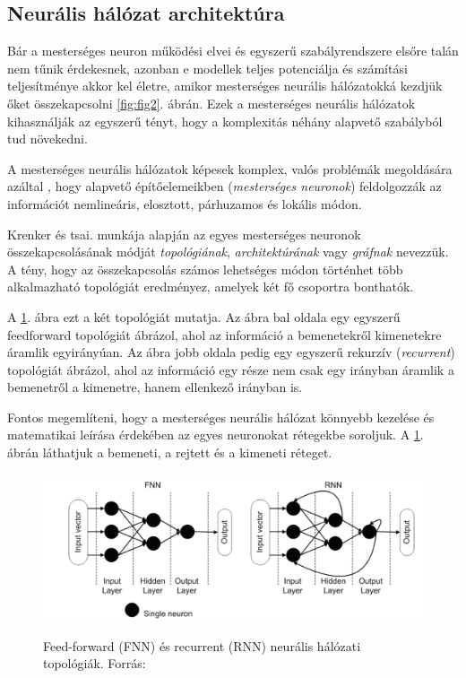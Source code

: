 \documentclass[12pt,a4]{article}
\begin{document}
	\subsection{Neurális hálózat architektúra}
	
	Bár a mesterséges neuron működési elvei és 
	egyszerű szabályrendszere elsőre talán nem tűnik érdekesnek, azonban e modellek teljes potenciálja és számítási teljesítménye akkor kel életre, 
	amikor mesterséges neurális hálózatokká
	kezdjük őket összekapcsolni \ref{fig:fig2}. ábrán. 
	Ezek a mesterséges neurális hálózatok 
	kihasználják az egyszerű tényt, 
	hogy a komplexitás néhány alapvető
	szabályból tud növekedni.
	
	A mesterséges neurális hálózatok 
	képesek komplex, valós problémák megoldására azáltal
	, hogy 
	alapvető építőelemeikben (\textit{mesterséges neuronok}) feldolgozzák az információt nemlineáris,
	elosztott, párhuzamos és lokális módon.
	
	Krenker és tsai. 
	\cite{krenker} munkája alapján az egyes mesterséges 
	neuronok összekapcsolásának módját 
	\textit{topológiának}, \textit{architektúrának} 
	vagy \textit{gráfnak} nevezzük. A tény, 
	hogy az összekapcsolás
	számos lehetséges módon történhet több alkalmazható topológiát eredményez, amelyek két fő csoportra bonthatók. 
	
	A \ref{fig:topologies}. ábra ezt a két topológiát mutatja. Az ábra bal oldala egy egyszerű feedforward topológiát ábrázol, ahol az információ a bemenetekről kimenetekre áramlik egyirányúan. Az ábra jobb oldala pedig egy egyszerű rekurzív (\textit{recurrent}) topológiát ábrázol, ahol az információ egy része nem csak egy irányban áramlik a bemenetről a kimenetre, hanem ellenkező irányban is.

	Fontos megemlíteni, hogy a mesterséges neurális hálózat könnyebb kezelése és matematikai leírása érdekében az egyes neuronokat rétegekbe soroljuk. A \ref{fig:topologies}. ábrán láthatjuk a bemeneti, a rejtett és a kimeneti réteget.
	\begin{figure}[h]	
		\centering
		\includegraphics[width=1\linewidth]{topologies}
        \label{fig:topologies}
		\caption{Feed-forward (FNN) és recurrent (RNN) \newline\centering  neurális hálózati topológiák. 
			Forrás:\cite{krenker}}
	\end{figure}
\end{document}
